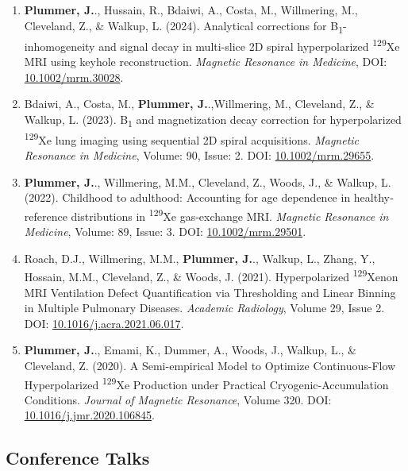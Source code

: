 \documentclass[12pt,]{scrartcl}
\begin{document}
\begin{enumerate}
    \item  \textbf{Plummer, J.}., Hussain, R., Bdaiwi, A., Costa, M., Willmering, M., Cleveland, Z., \& Walkup, L. (2024). Analytical corrections for B\textsubscript{1}-inhomogeneity and signal decay in multi-slice 2D spiral hyperpolarized \textsuperscript{129}Xe MRI using keyhole reconstruction. \textit{Magnetic Resonance in Medicine}, %
    DOI: \href{https://doi.org/10.1002/mrm.30028}{10.1002/mrm.30028}.
    \item  Bdaiwi, A., Costa, M., \textbf{Plummer, J.}.,Willmering, M., Cleveland, Z., \& Walkup, L. (2023). B\textsubscript{1} and magnetization decay correction for hyperpolarized \textsuperscript{129}Xe lung imaging using sequential 2D spiral acquisitions. \textit{Magnetic Resonance in Medicine}, Volume: 90, Issue: 2. DOI: \href{ https://doi.org/10.1002/mrm.29655}{ 10.1002/mrm.29655}.
    \item \textbf{Plummer, J.}., Willmering, M.M., Cleveland, Z., Woods, J., \& Walkup, L. (2022). Childhood to adulthood: Accounting for age dependence in healthy‐reference distributions in \textsuperscript{129}Xe gas‐exchange MRI. \textit{Magnetic Resonance in Medicine}, Volume: 89, Issue: 3. DOI: \href{https://onlinelibrary.wiley.com/share/GVTXYDIF3Y2VPZRHQRIK?target=10.1002/mrm.29501}{10.1002/mrm.29501}.
    \item Roach, D.J., Willmering, M.M., \textbf{Plummer, J.}., Walkup, L., Zhang, Y., Hossain, M.M., Cleveland, Z., \& Woods, J. (2021). Hyperpolarized \textsuperscript{129}Xenon MRI Ventilation Defect Quantification via Thresholding and Linear Binning in Multiple Pulmonary Diseases. \textit{Academic Radiology}, Volume 29, Issue 2. DOI: \href{https://doi.org/10.1016/j.acra.2021.06.017}{10.1016/j.acra.2021.06.017}.
  \item \textbf{Plummer, J.}., Emami, K., Dummer, A., Woods, J., Walkup, L., \& Cleveland, Z. (2020). A Semi-empirical Model to Optimize Continuous-Flow Hyperpolarized \textsuperscript{129}Xe Production under Practical Cryogenic-Accumulation Conditions. \textit{Journal of Magnetic Resonance}, Volume 320. DOI: \href{https://doi.org/10.1016/j.jmr.2020.106845}{10.1016/j.jmr.2020.106845}.

\end{enumerate}

\subsection{Conference Talks}\label{conferences_presentations}
\end{document}
